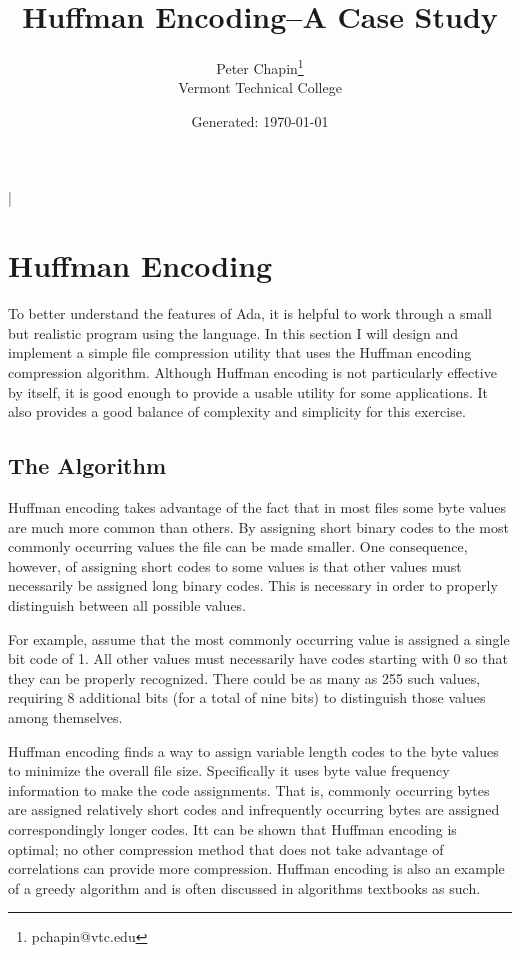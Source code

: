 \documentclass{scrreprt}
\begin{document}
\titlehead{\centering\texttt{[image: ../Ada-Mascot.pdf]}}
\title{Huffman Encoding--A Case Study}
\author{Peter Chapin\thanks{pchapin@vtc.edu}\\
  Vermont Technical College}
\date{Generated: \today}
\maketitle

\tableofcontents

\lstMakeShortInline|

\chapter{Huffman Encoding}
\label{chapt:huffman-encoding}

To better understand the features of Ada, it is helpful to work through a small but realistic
program using the language. In this section I will design and implement a simple file
compression utility that uses the Huffman encoding compression algorithm. Although Huffman
encoding is not particularly effective by itself, it is good enough to provide a usable utility
for some applications. It also provides a good balance of complexity and simplicity for this
exercise.

\section{The Algorithm}

Huffman encoding takes advantage of the fact that in most files some byte values are much more
common than others. By assigning short binary codes to the most commonly occurring values the
file can be made smaller. One consequence, however, of assigning short codes to some values is
that other values must necessarily be assigned long binary codes. This is necessary in order to
properly distinguish between all possible values.

For example, assume that the most commonly occurring value is assigned a single bit code of 1.
All other values must necessarily have codes starting with 0 so that they can be properly
recognized. There could be as many as 255 such values, requiring 8 additional bits (for a total
of nine bits) to distinguish those values among themselves.

Huffman encoding finds a way to assign variable length codes to the byte values to minimize the
overall file size. Specifically it uses byte value frequency information to make the code
assignments. That is, commonly occurring bytes are assigned relatively short codes and
infrequently occurring bytes are assigned correspondingly longer codes. Itt can be shown that
Huffman encoding is optimal; no other compression method that does not take advantage of
correlations can provide more compression. Huffman encoding is also an example of a greedy
algorithm and is often discussed in algorithms textbooks as such.
\end{document}
